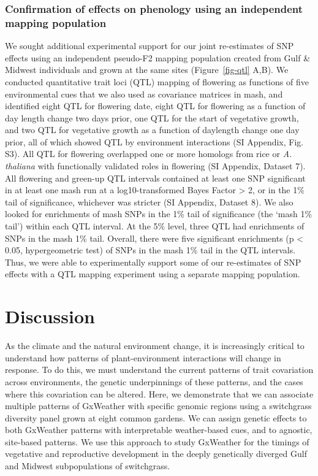 \documentclass[
  9pt,
  twocolumn,
  twoside]{pnas-new}
\begin{document}
\subsubsection{Confirmation of effects on phenology using an independent
mapping
population}\label{confirmation-of-effects-on-phenology-using-an-independent-mapping-population}

We sought additional experimental support for our joint re-estimates of
SNP effects using an independent pseudo-F2 mapping population created
from Gulf \& Midwest individuals and grown at the same sites
(Figure~\ref{fig-qtl} A,B). We conducted quantitative trait loci (QTL)
mapping of flowering as functions of five environmental cues that we
also used as covariance matrices in mash, and identified eight QTL for
flowering date, eight QTL for flowering as a function of day length
change two days prior, one QTL for the start of vegetative growth, and
two QTL for vegetative growth as a function of daylength change one day
prior, all of which showed QTL by environment interactions (SI Appendix,
Fig. S3). All QTL for flowering overlapped one or more homologs from
rice or \emph{A. thaliana} with functionally validated roles in
flowering (SI Appendix, Dataset 7). All flowering and green-up QTL
intervals contained at least one SNP significant in at least one mash
run at a log10-transformed Bayes Factor \textgreater{} 2, or in the 1\%
tail of significance, whichever was stricter (SI Appendix, Dataset 8).
We also looked for enrichments of mash SNPs in the 1\% tail of
significance (the `mash 1\% tail') within each QTL interval. At the 5\%
level, three QTL had enrichments of SNPs in the mash 1\% tail. Overall,
there were five significant enrichments (p \textless{} 0.05,
hypergeometric test) of SNPs in the mash 1\% tail in the QTL intervals.
Thus, we were able to experimentally support some of our re-estimates of
SNP effects with a QTL mapping experiment using a separate mapping
population.

\section{Discussion}\label{discussion}

As the climate and the natural environment change, it is increasingly
critical to understand how patterns of plant-environment interactions
will change in response. To do this, we must understand the current
patterns of trait covariation across environments, the genetic
underpinnings of these patterns, and the cases where this covariation
can be altered. Here, we demonstrate that we can associate multiple
patterns of GxWeather with specific genomic regions using a switchgrass
diversity panel grown at eight common gardens. We can assign genetic
effects to both GxWeather patterns with interpretable weather-based
cues, and to agnostic, site-based patterns. We use this approach to
study GxWeather for the timings of vegetative and reproductive
development in the deeply genetically diverged Gulf and Midwest
subpopulations of switchgrass.
\end{document}
